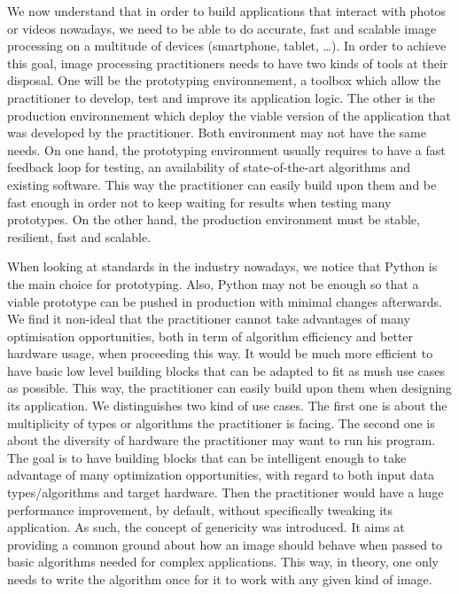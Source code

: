 We now understand that in order to build applications that interact with photos or videos nowadays, we need to be able
to do accurate, fast and scalable image processing on a multitude of devices (smartphone, tablet, \ldots). In order to
achieve this goal, image processing practitioners needs to have two kinds of tools at their disposal. One will be the
prototyping environnement, a toolbox which allow the practitioner to develop, test and improve its application logic.
The other is the production environnement which deploy the viable version of the application that was developed by the
practitioner. Both environment may not have the same needs. On one hand, the prototyping environment usually requires to
have a fast feedback loop for testing, an availability of state-of-the-art algorithms and existing software. This way
the practitioner can easily build upon them and be fast enough in order not to keep waiting for results when testing
many prototypes. On the other hand, the production environment must be stable, resilient, fast and scalable.

When looking at standards in the industry nowadays, we notice that Python is the main choice for prototyping. Also,
Python may not be enough so that a viable prototype can be pushed in production with minimal changes afterwards. We find
it non-ideal that the practitioner cannot take advantages of many optimisation opportunities, both in term of algorithm
efficiency and better hardware usage, when proceeding this way. It would be much more efficient to have basic low level
building blocks that can be adapted to fit as mush use cases as possible. This way, the practitioner can easily build
upon them when designing its application. We distinguishes two kind of use cases. The first one is about the
multiplicity of types or algorithms the practitioner is facing. The second one is about the diversity of hardware the
practitioner may want to run his program. The goal is to have building blocks that can be intelligent enough to take
advantage of many optimization opportunities, with regard to both input data types/algorithms and target hardware. Then
the practitioner would have a huge performance improvement, by default, without specifically tweaking its application.
As such, the concept of genericity was introduced. It aims at providing a common ground about how an image should behave
when passed to basic algorithms needed for complex applications. This way, in theory, one only needs to write the
algorithm once for it to work with any given kind of image.


